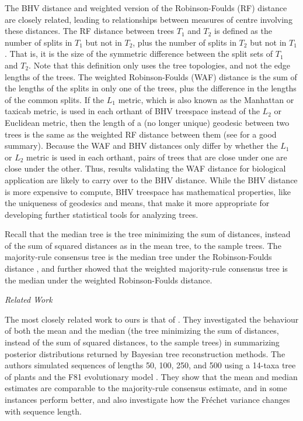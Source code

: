 \documentclass[12pt,letterpaper]{article}
\theoremstyle{plain}
\theoremstyle{definition}
\renewcommand{\subsection}[1]{%
\bigskip
\begin{center}
\begin{large}
\normalfont\itshape #1
\end{large}
\end{center}}
\begin{document}
The BHV distance and weighted version of the Robinson-Foulds (RF) distance \citep{RF} are closely related, leading to relationships between measures of centre involving these distances.  The RF distance between trees $T_1$ and $T_2$ is defined as the number of splits in $T_1$ but not in $T_2$, plus the number of splits in $T_2$ but not in $T_1$.  That is, it is the size of the symmetric difference between the split sets of $T_1$ and $T_2$.  Note that this definition only uses the tree topologies, and not the edge lengths of the trees.  The weighted Robinson-Foulds (WAF) distance \citep{weightedRF} is the sum of the lengths of the splits in only one of the trees, plus the difference in the lengths of the common splits.  If the $L_1$ metric, which is also known as the Manhattan or taxicab metric, is used in each orthant of BHV treespace instead of the $L_2$ or Euclidean metric, then the length of a (no longer unique) geodesic between two trees is the same as the weighted RF distance between them (see \citet{StJohnReview} for a good summary).  Because the WAF and BHV distances only differ by whether the $L_1$ or $L_2$ metric is used in each orthant, pairs of trees that are close under one are close under the other.  Thus, results validating the WAF distance for biological application \citep{kuhner2014practical} are likely to carry over to the BHV distance.  While the BHV distance is more expensive to compute, BHV treespace has mathematical properties, like the uniqueness of geodesics and means, that make it more appropriate for developing further statistical tools for analyzing trees.


Recall that the median tree is the tree minimizing the sum of distances, instead of the sum of squared distances as in the mean tree, to the sample trees.  The majority-rule consensus tree is the median tree under the Robinson-Foulds distance \citep{BarthelemyMcMorris}, and \citet{Pattengale} further showed that the weighted majority-rule consensus tree is the median under the weighted Robinson-Foulds distance.


\subsection{Related Work}
The most closely related work to ours is that of \citet{BennerBacakBourguignon}.  They investigated the behaviour of both the mean and the median (the tree minimizing the sum of distances, instead of the sum of squared distances, to the sample trees) in summarizing posterior distributions returned by Bayesian tree reconstruction methods. The authors simulated sequences of lengths 50, 100, 250, and 500 using a 14-taxa tree of plants and the F81 evolutionary model \citep{F81}.  They show that the mean and median estimates are comparable to the majority-rule consensus estimate, and in some instances perform better, and also investigate how the Fr\'echet variance changes with sequence length.
\end{document}
